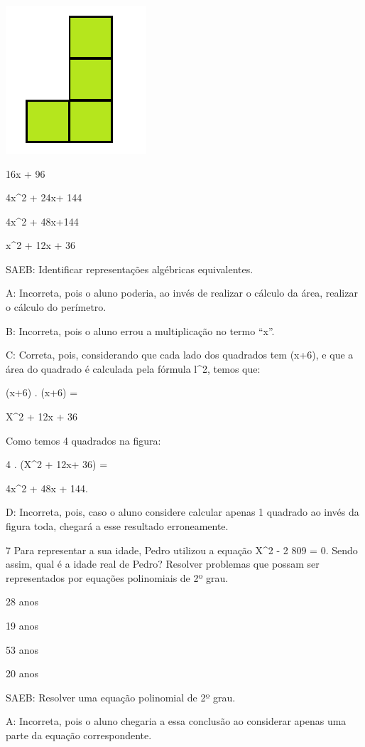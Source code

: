 {\includegraphics[width=2.05833in,height=2.16573in]{./imgSAEB_8_MAT/media/image57.png}
\item 16x + 96
\item 4x^2 + 24x+ 144
\item 4x^2 + 48x+144
\item x^2 + 12x + 36

SAEB: Identificar representações algébricas equivalentes.

A: Incorreta, pois o aluno poderia, ao invés de realizar o cálculo da
área, realizar o cálculo do perímetro.

B: Incorreta, pois o aluno errou a multiplicação no termo ``x''.

C: Correta, pois, considerando que cada lado dos quadrados tem (x+6), e
que a área do quadrado é calculada pela fórmula l^2, temos que:

(x+6) . (x+6) =

X^2 + 12x + 36

Como temos 4 quadrados na figura:

4 . (X^2 + 12x+ 36) =

4x^2 + 48x + 144.

D: Incorreta, pois, caso o aluno considere calcular apenas 1 quadrado ao
invés da figura toda, chegará a esse resultado erroneamente.

\num{7} Para representar a sua idade, Pedro utilizou a equação X^2 - 2 809 =
0. Sendo assim, qual é a idade real de Pedro? Resolver problemas que
possam ser representados por equações polinomiais de 2º grau.
\item 28 anos
\item 19 anos
\item 53 anos
\item 20 anos

SAEB: Resolver uma equação polinomial de 2º grau.

A: Incorreta, pois o aluno chegaria a essa conclusão ao considerar
apenas uma parte da equação correspondente.

}
